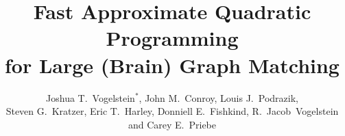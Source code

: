 \documentclass[preprint,11pt]{elsarticle}
\begin{document}
	\begin{frontmatter}


\title{Fast Approximate Quadratic Programming \\ for Large (Brain) Graph Matching}
\author{Joshua T.~Vogelstein$^*$, John M.~Conroy, Louis J.~Podrazik, \\ Steven G.~Kratzer, Eric T.~Harley, 
        Donniell E.~Fishkind, 
		R.~Jacob~Vogelstein
        and Carey E.~Priebe}

\address{		J.T. Vogelstein, E.T. Harley, D.E. Fishkind, and C.E. Priebe are with the Department of Applied Mathematics and Statistics, Johns Hopkins University, Baltimore, MD 21218. 
\\ J.M. Conroy, L.J. Podrazik and S.G. Kratzer are with Institute for Defense Analyses, Center for Computing Sciences, Bowie, MD 20708. 
\\ R.J. Vogelstein is with the Johns Hopkins University Applied Physics Laboratory, Laurel, MD, 20723. \\ $^*$ corresponding author; current address: Department of Statistical Science, Duke University, Durham, NC 27708; current phone number: +1-443-858-9911; current email address: \url{jovo@stat.duke.edu} }

 

\end{frontmatter}
\end{document}
